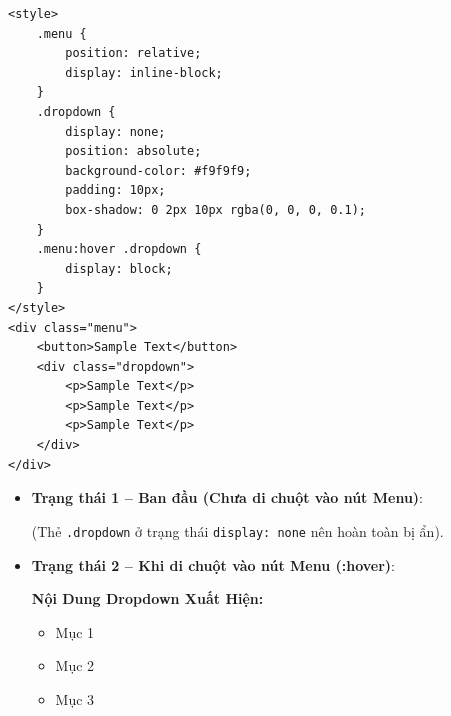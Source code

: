 \documentclass[11pt,oneside]{book}
\newcommand{\codeinline}[1]{\textcolor{accentOrange}{\texttt{#1}}}
\begin{document}
\begin{codeWindow}
\begin{lstlisting}[language=HTML5]
<style>
    .menu {
        position: relative;
        display: inline-block;
    }
    .dropdown {
        display: none;
        position: absolute;
        background-color: #f9f9f9;
        padding: 10px;
        box-shadow: 0 2px 10px rgba(0, 0, 0, 0.1);
    }
    .menu:hover .dropdown {
        display: block;
    }
</style>
<div class="menu">
    <button>Sample Text</button>
    <div class="dropdown">
        <p>Sample Text</p>
        <p>Sample Text</p>
        <p>Sample Text</p>
    </div>
</div>
\end{lstlisting}
\end{codeWindow}

\begin{browserWindow}
\begin{itemize}[leftmargin=1.5em, itemsep=3pt, parsep=0pt]
    \item \textbf{Trạng thái 1 -- Ban đầu (Chưa di chuột vào nút Menu)}:
    \par\vspace{2pt}
    \tcbox[on line, arc=3pt, colback=gray!10, colframe=gray!40, boxrule=0.8pt, boxsep=3pt]{%
        \small\sffamily\bfseries [ Menu ]%
    }
    \quad (Thẻ \codeinline{.dropdown} ở trạng thái \codeinline{display: none} nên hoàn toàn bị ẩn).
    \par\vspace{5pt}
    \item \textbf{Trạng thái 2 -- Khi di chuột vào nút Menu (:hover)}:
    \par\vspace{2pt}
    \par\vspace{4pt}
    \begin{tcolorbox}[arc=4pt, colback=primaryBlue!5, colframe=primaryBlue!30, boxrule=0.8pt, top=6pt, bottom=6pt, left=10pt, right=10pt]
      \sffamily\small\bfseries\color{primaryBlue} Nội Dung Dropdown Xuất Hiện:
      \begin{itemize}[leftmargin=1.2em, itemsep=1pt]
          \item Mục 1
          \item Mục 2
          \item Mục 3
      \end{itemize}
    \end{tcolorbox}
\end{itemize}
\end{browserWindow}
\end{document}
